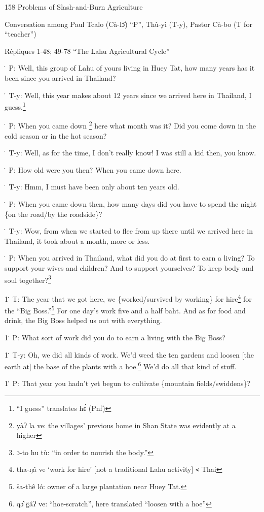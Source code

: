 
158 Problems of Slash-and-Burn Agriculture

Conversation among Paul Tcalo (Cà-lɔ̂) ``P'', Thû-yì (T-y), Pastor Cà-bo
(T for ``teacher'')

Répliques 1-48; 49-78 ``The Lahu Agricultural Cycle''

\. P: Well, this group of Lahu of yours living in Huey Tat, how many years has
it been since you arrived in Thailand?

\. T-y: Well, this year makes about 12 years since we arrived here in Thailand,
I guess.\footnote{``I guess'' translates hɛ́ (Pnf)}

\. P: When you came down \footnote{yàʔ la ve: the villages' previous home in Shan State was evidently at a higher} here what month was it? Did you come down in the cold
season or in the hot season?

\. T-y: Well, as for the time, I don't really know! I was still a kid then, you
know.

\. P: How old were you then? When you came down here.

\. T-y: Hmm, I must have been only about ten years old.

\. P: When you came down then, how many days did you have to spend the night \{on
the road/by the roadside\}?

\. T-y: Wow, from when we started to flee from up there until we arrived here in
Thailand, it took about a month, more or less.

\. P: When you arrived in Thailand, what did you do at first to earn a living?
To support your wives and children? And to support yourselves? To keep body and
soul together?\footnote{ɔ-to hu tù: ``in order to nourish the body.''}

1\. T: The year that we got here, we \{worked/survived by working\} for hire\footnote{tha-ŋâ ve `work for hire' [not a traditional Lahu activity] \texttt{<} Thai}
for the ``Big Boss.''\footnote{ša-thê ló: owner of a large plantation near Huey Tat.} For one day's work five and a half baht. And as for food
and drink, the Big Boss helped us out with everything.

1\. P: What sort of work did you do to earn a living with the Big Boss?

1\. T-y: Oh, we did all kinds of work. We'd weed the ten gardens and loosen [the
earth at] the base of the plants with a hoe.\footnote{qɔ̂ g̈âʔ ve: ``hoe-scratch'', here translated ``loosen with a hoe''} We'd do all that kind of stuff.

1\. P: That year you hadn't yet begun to cultivate \{mountain fields/swiddens\}?

